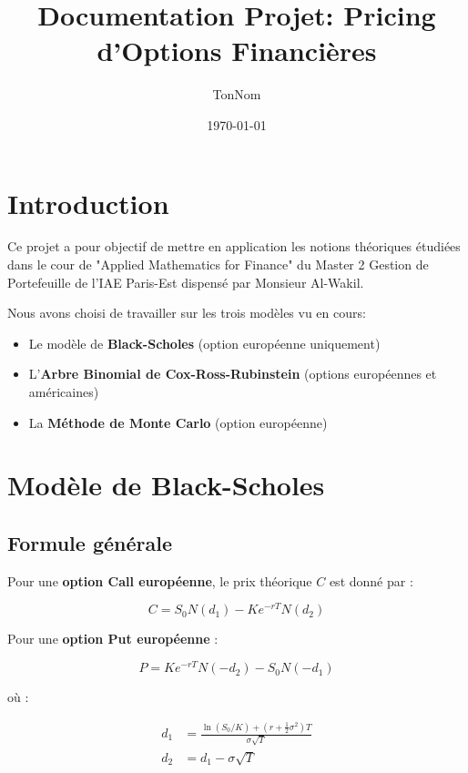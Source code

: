 \documentclass{article}
\title{Documentation Projet: Pricing d'Options Financières}
\author{TonNom}
\date{\today}
\begin{document}
\maketitle

\tableofcontents
\newpage

\section{Introduction}

Ce projet a pour objectif de mettre en application les notions théoriques étudiées dans le cour de "Applied Mathematics for Finance" du Master 2 Gestion de Portefeuille de l'IAE Paris-Est dispensé par Monsieur Al-Wakil.

Nous avons choisi de travailler sur les trois modèles vu en cours:
\begin{itemize}
    \item Le modèle de \textbf{Black-Scholes} (option européenne uniquement)
    \item L'\textbf{Arbre Binomial de Cox-Ross-Rubinstein} (options européennes et américaines)
    \item La \textbf{Méthode de Monte Carlo} (option européenne)
\end{itemize}

\section{Modèle de Black-Scholes}

\subsection{Formule générale}

Pour une \textbf{option Call européenne}, le prix théorique \( C \) est donné par :

\begin{equation}
C = S_0 N(d_1) - Ke^{-rT} N(d_2)
\end{equation}

Pour une \textbf{option Put européenne} :

\begin{equation}
P = Ke^{-rT} N(-d_2) - S_0 N(-d_1)
\end{equation}

où :

\begin{align}
d_1 &= \frac{\ln(S_0/K) + (r + \frac{1}{2}\sigma^2)T}{\sigma \sqrt{T}} \\
d_2 &= d_1 - \sigma \sqrt{T}
\end{align}
\end{document}
